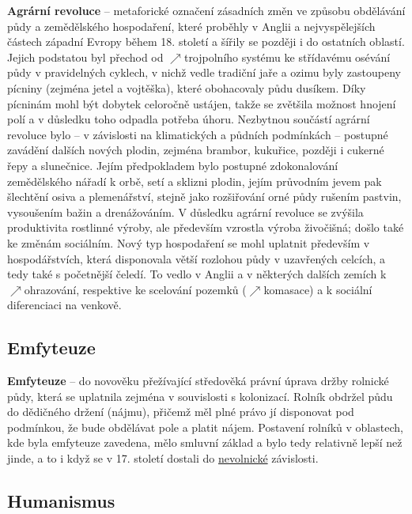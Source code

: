 \documentclass{article}
\begin{document}
  {\bf Agrární revoluce} -- metaforické označení zásadních změn ve způsobu obdělávání půdy a zemědělského hospodaření, které proběhly v Anglii a nejvyspělejších částech západní Evropy během 18. století a šířily se později i do ostatních oblastí. Jejich podstatou byl přechod od $\nearrow$trojpolního systému ke střídavému osévání půdy v pravidelných cyklech, v nichž vedle tradiční jaře a ozimu byly zastoupeny pícniny (zejména jetel a vojtěška), které obohacovaly půdu dusíkem. Díky pícninám mohl být dobytek celoročně ustájen, takže se zvětšila možnost hnojení polí a v důsledku toho odpadla potřeba úhoru. Nezbytnou součástí agrární revoluce bylo -- v závislosti na klimatických a půdních podmínkách -- postupné zavádění dalších nových plodin, zejména brambor, kukuřice, později i cukerné řepy a slunečnice. Jejím předpokladem bylo postupné zdokonalování zemědělského nářadí k orbě, setí a sklizni plodin, jejím průvodním jevem pak šlechtění osiva a plemenářství, stejně jako rozšiřování orné půdy rušením pastvin, vysoušením bažin a drenážováním. V důsledku agrární revoluce se zvýšila produktivita rostlinné výroby, ale především vzrostla výroba živočišná; došlo také ke změnám sociálním. Nový typ hospodaření se mohl uplatnit především v hospodářstvích, která disponovala větší rozlohou půdy v uzavřených celcích, a tedy také s početnější čeledí. To vedlo v Anglii a v některých dalších zemích k $\nearrow$ohrazování, respektive ke scelování pozemků ($\nearrow$komasace) a k sociální diferenciaci na venkově.

  \subsection*{Emfyteuze~\cite{Hroch:}}
  \label{sec:emfyteuze}

  {\bf Emfyteuze} -- do novověku přežívající středověká právní úprava držby rolnické půdy, která se uplatnila zejména v souvislosti s kolonizací. Rolník obdržel půdu do dědičného držení (nájmu), přičemž měl plné právo jí disponovat pod podmínkou, že bude obdělávat pole a platit nájem. Postavení rolníků v oblastech, kde byla emfyteuze zavedena, mělo smluvní základ a bylo tedy relativně lepší než jinde, a to i když se v 17. století dostali do \hyperref[sec:nevolnictvi]{nevolnické} závislosti.

  \subsection*{Humanismus~\cite{Hroch:}}
  \label{sec:humanismus}
\end{document}
